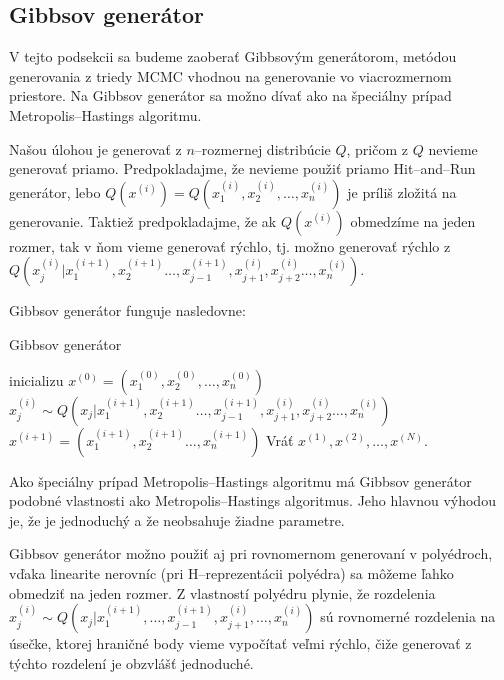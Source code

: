 \subsection{Gibbsov generátor}

V tejto podsekcii sa budeme zaoberať Gibbsovým generátorom, metódou generovania z triedy MCMC vhodnou na generovanie vo viacrozmernom priestore. Na Gibbsov generátor sa možno dívať ako na špeciálny prípad Metropolis--Hastings algoritmu.

Našou úlohou je generovať z $n$--rozmernej distribúcie $Q$, pričom z $Q$ nevieme generovať priamo. Predpokladajme, že nevieme použiť priamo Hit--and--Run generátor, lebo $Q(x^{(i)})=Q(x^{(i)}_1, x^{(i)}_2, \dots, x^{(i)}_n)$ je príliš zložitá na generovanie. Taktiež predpokladajme, že ak $Q(x^{(i)})$ obmedzíme na jeden rozmer, tak v ňom vieme generovať rýchlo, tj. možno generovať rýchlo z $Q(x^{(i)}_j | x^{(i+1)}_1, x^{(i+1)}_2 \dots, x^{(i+1)}_{j-1}, x^{(i)}_{j+1}, x^{(i)}_{j+2} \dots, x^{(i)}_n)$.

Gibbsov generátor funguje nasledovne:

\begin{algorithm}[H]
	\caption{Gibbsov generátor \cite{mcmc_intro_mackay}}
	\label{gibbs}
	\begin{algorithmic}[1]
		\State inicializu $x^{(0)} = (x^{(0)}_1, x^{(0)}_2, \dots, x^{(0)}_n)$
				\State $x^{(i)}_j \sim Q(x_j | x^{(i+1)}_1, x^{(i+1)}_2 \dots, x^{(i+1)}_{j-1}, x^{(i)}_{j+1}, x^{(i)}_{j+2} \dots, x^{(i)}_n)$
			\EndFor
			\State $x^{(i+1)}= (x^{(i+1)}_1, x^{(i+1)}_2 \dots, x^{(i+1)}_n)$
		\EndFor
		\State Vráť ${x^{(1)},x^{(2)},\dots,x^{(N)}}$.
	\end{algorithmic}
\end{algorithm}

Ako špeciálny prípad Metropolis--Hastings algoritmu má Gibbsov generátor podobné vlastnosti ako Metropolis--Hastings algoritmus. Jeho hlavnou výhodou je, že je jednoduchý a že neobsahuje žiadne parametre.

Gibbsov generátor možno použiť aj pri rovnomernom generovaní v polyédroch, vďaka linearite nerovníc (pri H--reprezentácii polyédra) sa môžeme ľahko obmedziť na jeden rozmer. Z vlastností polyédru plynie, že rozdelenia $x^{(i)}_j \sim Q(x_j | x^{(i+1)}_1, \dots, x^{(i+1)}_{j-1}, x^{(i)}_{j+1}, \dots, x^{(i)}_n)$ sú rovnomerné rozdelenia na úsečke, ktorej hraničné body vieme vypočítať veľmi rýchlo, čiže generovať z týchto rozdelení je obzvlášť jednoduché.